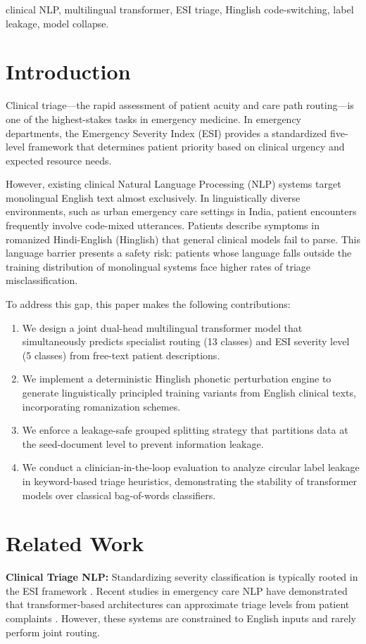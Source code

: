 \documentclass[10pt,conference]{IEEEtran}
\begin{document}
\begin{IEEEkeywords}
clinical NLP, multilingual transformer, ESI triage, Hinglish code-switching, label leakage, model collapse.
\end{IEEEkeywords}

\section{Introduction}
Clinical triage—the rapid assessment of patient acuity and care path routing—is one of the highest-stakes tasks in emergency medicine. In emergency departments, the Emergency Severity Index (ESI) provides a standardized five-level framework that determines patient priority based on clinical urgency and expected resource needs.

However, existing clinical Natural Language Processing (NLP) systems target monolingual English text almost exclusively. In linguistically diverse environments, such as urban emergency care settings in India, patient encounters frequently involve code-mixed utterances. Patients describe symptoms in romanized Hindi-English (Hinglish) that general clinical models fail to parse. This language barrier presents a safety risk: patients whose language falls outside the training distribution of monolingual systems face higher rates of triage misclassification.

To address this gap, this paper makes the following contributions:
\begin{enumerate}
    \item We design a joint dual-head multilingual transformer model that simultaneously predicts specialist routing (13 classes) and ESI severity level (5 classes) from free-text patient descriptions.
    \item We implement a deterministic Hinglish phonetic perturbation engine to generate linguistically principled training variants from English clinical texts, incorporating romanization schemes.
    \item We enforce a leakage-safe grouped splitting strategy that partitions data at the seed-document level to prevent information leakage.
    \item We conduct a clinician-in-the-loop evaluation to analyze circular label leakage in keyword-based triage heuristics, demonstrating the stability of transformer models over classical bag-of-words classifiers.
\end{enumerate}

\section{Related Work}
\textbf{Clinical Triage NLP:} Standardizing severity classification is typically rooted in the ESI framework \cite{wuerz1998emergency, ena2020esi}. Recent studies in emergency care NLP have demonstrated that transformer-based architectures can approximate triage levels from patient complaints \cite{triagenlu2025}. However, these systems are constrained to English inputs and rarely perform joint routing.
\end{document}
